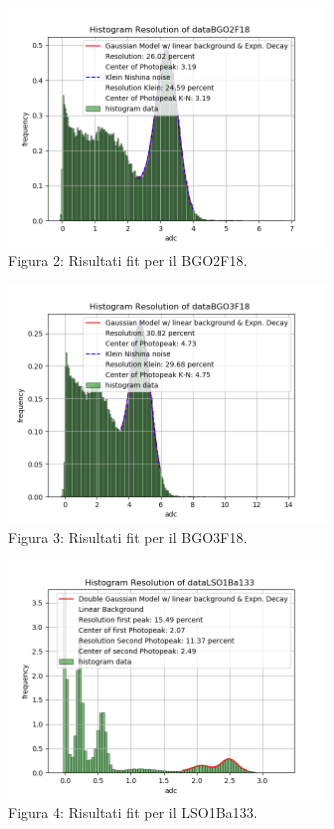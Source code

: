 \documentclass[a4paper]{article}
\begin{document}
\begin{figure}[H]
\centering
\includegraphics[width=0.75\textwidth]{histkleindataBGO2F18}
\caption{Figura 2: Risultati fit per il BGO2F18.}
\end{figure}
\begin{figure}[H]
\centering
\includegraphics[width=0.75\textwidth]{histkleindataBGO3F18}
\caption{Figura 3: Risultati fit per il BGO3F18.}
\end{figure}
\begin{figure}[H]
\centering
\includegraphics[width=0.75\textwidth]{histdataLSO1Ba133}
\caption{Figura 4: Risultati fit per il LSO1Ba133.}
\end{figure}
\end{document}
